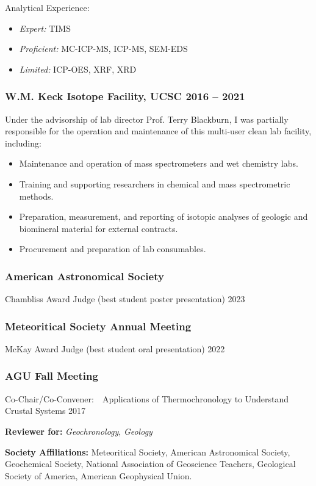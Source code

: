 Analytical Experience:
	\begin{itemize} [label={}]
		\item \textit{Expert:} TIMS
		\item \textit{Proficient:} MC-ICP-MS, ICP-MS, SEM-EDS
		\item \textit{Limited:} ICP-OES, XRF, XRD
	\end{itemize} 
\subsubsection*{W.M. Keck Isotope Facility{\normalfont , UCSC \hfill 2016 -- 2021}}
Under the advisorship of lab director Prof. Terry Blackburn, I was partially responsible for the operation and maintenance of this multi-user clean lab facility, including:
	\begin{itemize} 
	\item Maintenance and operation of mass spectrometers and wet chemistry labs.
	\item Training and supporting researchers in chemical and mass spectrometric methods.
	\item Preparation, measurement, and reporting of isotopic analyses of geologic and biomineral material for external contracts.
	\item Procurement and preparation of lab consumables.
	\end{itemize}

\subsubsection*{American Astronomical Society}
	Chambliss Award Judge (best student poster presentation) \hfill 2023

\subsubsection*{Meteoritical Society Annual Meeting}
	McKay Award Judge (best student oral presentation) \hfill 2022

\subsubsection*{AGU Fall Meeting}
	Co-Chair/Co-Convener:~~Applications of Thermochronology to Understand Crustal Systems \hfill 2017

\vspace{2ex}
\begin{hangparas}{5ex}{1}
	\textbf{Reviewer for:} \textit{Geochronology}, \textit{Geology}

	\vspace{2ex}
	\textbf{Society Affiliations:} Meteoritical Society, American Astronomical Society, Geochemical Society, National Association of Geoscience Teachers, Geological Society of America, American Geophysical Union.
\end{hangparas}